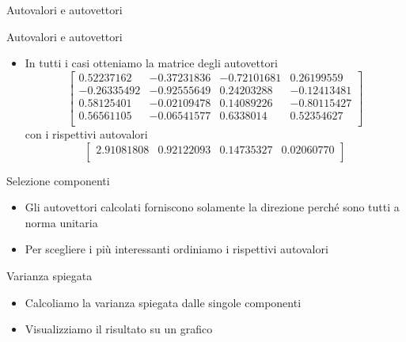 \documentclass[xcolor={dvipsnames}]{beamer}
\newcommand{\codice}[2]{}
\begin{document}
		\begin{frame}{Autovalori e autovettori}
			\codice{61}{82}
		\end{frame}
	
		\begin{frame}{Autovalori e autovettori}
			\codice{84}{94}
			\begin{spacing}{0.8}
				\begin{itemize}
					\item In tutti i casi otteniamo la matrice degli autovettori 
						{
							\small
							$$\begin{bmatrix}
								0.52237162 & -0.37231836 & -0.72101681 & 0.26199559\\
								-0.26335492 & -0.92555649 & 0.24203288 & -0.12413481\\
								0.58125401 & -0.02109478 & 0.14089226 & -0.80115427\\
								0.56561105 & -0.06541577 & 0.6338014 & 0.52354627\\
							\end{bmatrix}$$
						}
						con i rispettivi autovalori
						{
							\small
							$$\begin{bmatrix}
								2.91081808 & 0.92122093 & 0.14735327 & 0.02060770\\
							\end{bmatrix}$$
						}						
				\end{itemize}
			\end{spacing}
		\end{frame}
	
		\begin{frame}{Selezione componenti}
			\begin{itemize}
				\item Gli autovettori calcolati forniscono solamente la direzione perché sono tutti a norma unitaria
				\item Per scegliere i più interessanti ordiniamo i rispettivi autovalori
			\end{itemize}
			\codice{96}{102}
		\end{frame}

		\begin{frame}{Varianza spiegata}
			\begin{itemize}
				\item Calcoliamo la varianza spiegata dalle singole componenti
				\item Visualizziamo il risultato su un grafico
			\end{itemize}
			\codice{108}{123}
		\end{frame}
\end{document}
